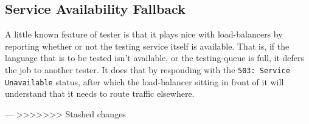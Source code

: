 \subsection{Service Availability Fallback}
A little known feature of tester is that it plays nice with load-balancers by reporting whether or not the testing service itself is available. That is, if the language that is to be tested isn't available, or the testing-queue is full, it defers the job to another tester. It does that by responding with the \texttt{503: Service Unavailable} status, after which the load-balancer sitting in front of it will understand that it needs to route traffic elsewhere.





























---
>>>>>>> Stashed changes
